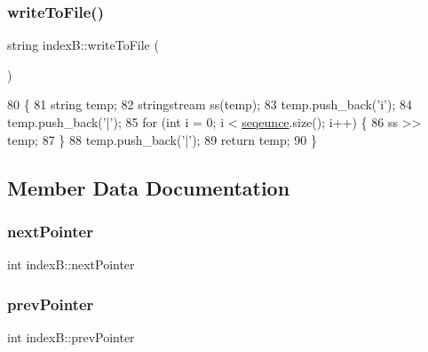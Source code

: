\subsubsection{\texorpdfstring{write\+To\+File()}{writeToFile()}}
{\footnotesize\ttfamily string index\+B\+::write\+To\+File (\begin{DoxyParamCaption}{ }\end{DoxyParamCaption})\hspace{0.3cm}{\ttfamily [inline]}}


\begin{DoxyCode}
80                          \{
81         \textcolor{keywordtype}{string} temp;
82         stringstream ss(temp);
83         temp.push\_back(\textcolor{charliteral}{'i'});
84         temp.push\_back(\textcolor{charliteral}{'|'});
85         \textcolor{keywordflow}{for} (\textcolor{keywordtype}{int} i = 0; i < \mbox{\hyperlink{structindex_b_a2d8b28953bea6e6bdc221993ef60864a}{seqeunce}}.size(); i++) \{
86             ss >> temp;
87         \}
88         temp.push\_back(\textcolor{charliteral}{'|'});
89         \textcolor{keywordflow}{return} temp;
90     \}
\end{DoxyCode}


\subsection{Member Data Documentation}
\mbox{\label{structindex_b_a40845f21f1bf3ba1c5c64b1065283d97}} 
\subsubsection{\texorpdfstring{next\+Pointer}{nextPointer}}
{\footnotesize\ttfamily int index\+B\+::next\+Pointer}

\mbox{\label{structindex_b_a6281f24532b9dedfefe7e2a4ce86800c}} 
\subsubsection{\texorpdfstring{prev\+Pointer}{prevPointer}}
{\footnotesize\ttfamily int index\+B\+::prev\+Pointer}

\mbox{\label{structindex_b_a2d8b28953bea6e6bdc221993ef60864a}} 
